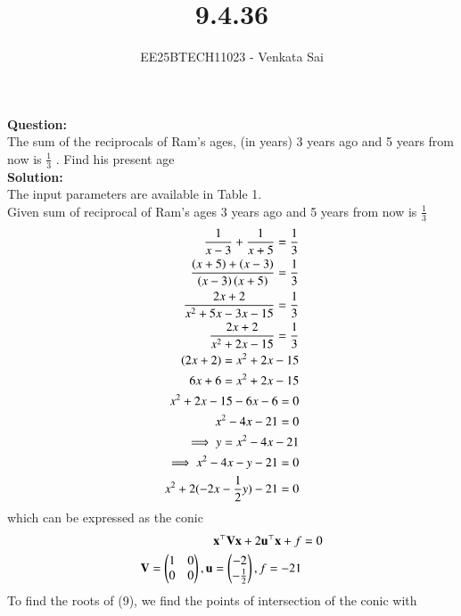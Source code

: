 \documentclass[journal]{IEEEtran}
\begin{document}


\title{9.4.36}
\author{EE25BTECH11023 - Venkata Sai}
\maketitle
\renewcommand{\thefigure}{\theenumi}
\renewcommand{\thetable}{\theenumi}
\setlength{\intextsep}{10pt} %

\renewcommand{\thetable}{\theenumi}

\textbf{Question:}  \\
The sum of the reciprocals of Ram's ages, (in years) 3 years ago and 5 years from
now is $\frac{1}{3}$ . Find his present age\\
\textbf{Solution:}  \\
 The input parameters are available in Table 1.\\

Given sum of reciprocal of Ram's ages 3 years ago and 5 years from
now is $\frac{1}{3}$
\begin{align}
\frac{1}{x-3}+\frac{1}{x+5}=\frac{1}{3} \\
\frac{\left(x+5\right)+\left(x-3\right)}{\left(x-3\right)\left(x+5\right)}=\frac{1}{3} \\
\frac{2x+2}{x^2+5x-3x-15}=\frac{1}{3}\\
\frac{2x+2}{x^2+2x-15}=\frac{1}{3}\\
\left(2x+2\right)=x^2+2x-15\\
6x+6=x^2+2x-15 \\
x^2+2x-15-6x-6=0 \\
x^2-4x-21=0 \\
\implies y=x^2-4x-21 \\
\implies x^2-4x-y-21=0\\
x^2+2(-2x-\frac{1}{2}y)-21=0
  \end{align}
  which can be expressed as the conic
  \begin{align}
       \mathbf{x}^\top\mathbf{V}\mathbf{x} + 2\mathbf{u}^\top\mathbf{x} + f &= 0 \\
       \mathbf{V}=\begin{pmatrix}1 & 0 \\ 0&0\end{pmatrix},\mathbf{u}=\begin{pmatrix}-2\\-\frac{1}{2}\end{pmatrix},f=-21
  \end{align}
  To find the roots of (9), we find the points of intersection of the conic with
\end{document}
